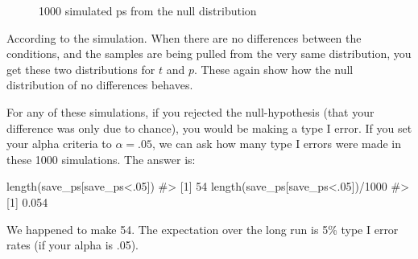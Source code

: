 \documentclass[
  letterpaper,
  DIV=11,
  numbers=noendperiod]{scrreprt}
\newenvironment{Shaded}{\begin{snugshade}}{\end{snugshade}}
\newcommand{\CommentTok}[1]{\textcolor[rgb]{0.37,0.37,0.37}{#1}}
\newcommand{\DecValTok}[1]{\textcolor[rgb]{0.68,0.00,0.00}{#1}}
\newcommand{\FunctionTok}[1]{\textcolor[rgb]{0.28,0.35,0.67}{#1}}
\newcommand{\NormalTok}[1]{\textcolor[rgb]{0.00,0.23,0.31}{#1}}
\newcommand{\SpecialCharTok}[1]{\textcolor[rgb]{0.37,0.37,0.37}{#1}}
\begin{document}
\begin{figure}


\caption{\label{fig-7simts1000}1000 simulated ps from the null
distribution}

\end{figure}%

According to the simulation. When there are no differences between the
conditions, and the samples are being pulled from the very same
distribution, you get these two distributions for \(t\) and \(p\). These
again show how the null distribution of no differences behaves.

For any of these simulations, if you rejected the null-hypothesis (that
your difference was only due to chance), you would be making a type I
error. If you set your alpha criteria to \(\alpha = .05\), we can ask
how many type I errors were made in these 1000 simulations. The answer
is:

\begin{Shaded}
\begin{Highlighting}[]
\FunctionTok{length}\NormalTok{(save\_ps[save\_ps}\SpecialCharTok{\textless{}}\NormalTok{.}\DecValTok{05}\NormalTok{])}
\CommentTok{\#\textgreater{} [1] 54}
\FunctionTok{length}\NormalTok{(save\_ps[save\_ps}\SpecialCharTok{\textless{}}\NormalTok{.}\DecValTok{05}\NormalTok{])}\SpecialCharTok{/}\DecValTok{1000}
\CommentTok{\#\textgreater{} [1] 0.054}
\end{Highlighting}
\end{Shaded}

We happened to make 54. The expectation over the long run is 5\% type I
error rates (if your alpha is .05).
\end{document}
